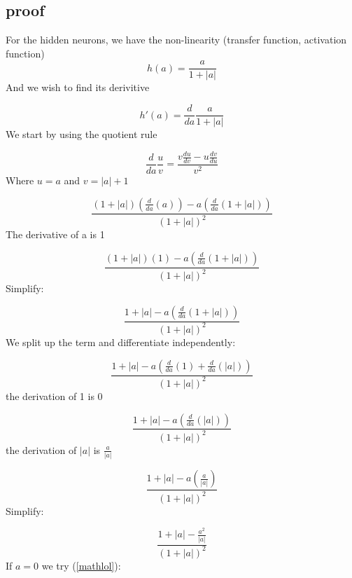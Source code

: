 \subsection{proof}

For the hidden neurons, we have the non-linearity (transfer function, activation function)
\begin{equation*}
    h(a) = \frac{a}{1 + |a|}
\end{equation*}
And we wish to find its derivitive 

\begin{equation*}
    h'(a) = \frac{d}{da}\frac{a}{1 + |a|}
\end{equation*}
We start by using the quotient rule 

\begin{equation*}
    \frac{d}{da} \frac{u}{v} = \frac{v \frac{du}{dv} - u\frac{dv}{du}}{v^2}
\end{equation*}
Where $u = a$ and $v = |a| + 1$

\begin{equation*}
    \frac{(1 + |a|) (\frac{d}{da}(a)) - a(\frac{d}{da}(1 + |a|))}{(1 + |a|)^2}
\end{equation*}
The derivative of a is 1

\begin{equation*}
    \frac{(1 + |a|)(1) - a(\frac{d}{da}(1 + |a|))}{(1 + |a|)^2}
\end{equation*}
Simplify:

\begin{equation*}
    \frac{1 + |a| - a(\frac{d}{da}(1 + |a|))}{(1 + |a|)^2}
\end{equation*}
We split up the term and differentiate independently:

\begin{equation*}
    \frac{1 + |a| - a(\frac{d}{da}(1) + \frac{d}{da}(|a|))}{(1 + |a|)^2}
\end{equation*}
the derivation of 1 is 0

\begin{equation*}
    \frac{1 + |a| - a(\frac{d}{da}(|a|))}{(1 + |a|)^2}
\end{equation*}
the derivation of $|a|$ is $\frac{a}{|a|}$

\begin{equation*}
    \frac{1 + |a| - a(\frac{a}{|a|})}{(1 + |a|)^2}
\end{equation*}
Simplify:

\begin{equation} \label{mathlol}
    \frac{1 + |a| - \frac{a^2}{|a|}}{(1 + |a|)^2}
\end{equation}
If $a = 0$ we try (\ref{mathlol}):

